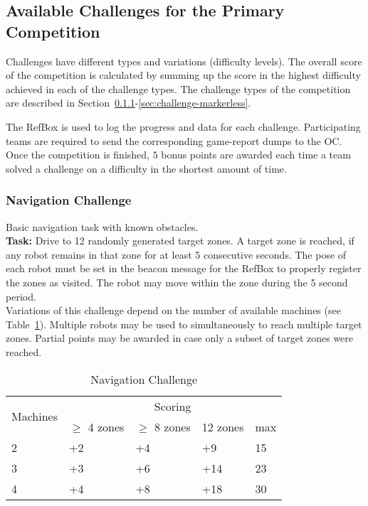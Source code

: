 \documentclass[12pt,twoside]{article}
\newcommand{\refsec}[1]{Section~\ref{#1}}
\newcommand{\reftab}[1]{Table~\ref{#1}}
\begin{document}
\subsection{Available Challenges for the Primary Competition}
\label{sec:challenges}
Challenges have different types and variations (difficulty levels).
The overall score of the competition is calculated by summing up the score
in the highest difficulty achieved in each of the challenge types.
The challenge types of the competition are described in
\refsec{sec:challenge-navigation}-\ref{sec:challenge-markerless}.

The RefBox is used to log the progress and data for each challenge.
Participating teams are required to send the corresponding game-report dumps
to the \ac{OC}.
Once the competition is finished, $5$ bonus points are awarded each time a
team solved a challenge on a difficulty in the shortest amount of time.

\subsubsection{Navigation Challenge}\label{sec:challenge-navigation}
Basic navigation task with known obstacles.\\
\textbf{Task:} Drive to 12 randomly generated target zones. A target zone is
reached, if any robot remains in that zone for at least 5 consecutive seconds.
The pose of each robot must be set in the beacon message
for the RefBox to properly register the zones as visited. The robot may move
within the zone during the 5 second period.\\
Variations of this challenge depend on the number of available machines
(see \reftab{tab:challenge-navigation}).
Multiple robots may be used to simultaneously to reach multiple target zones.
Partial points may be awarded in case only a subset of target zones were
reached.

\begin{table}[!htb]
 \centering
 \begin{tabular}{l|l|l|l|l}
  \multirow{2}{*}{Machines}
  & \multicolumn{4}{c}{Scoring} \\\cline{2-5}
	& $\geq$ 4 zones  & $\geq$ 8 zones & 12 zones  & max \\\hline\hline
	 2 & +2 & +4 & +9 & 15 \\
	 3 & +3 & +6 & +14 & 23 \\
	 4 & +4 & +8 & +18 & 30 \\
 \end{tabular}
 \caption{Navigation Challenge}
 \label{tab:challenge-navigation}
\end{table}
\end{document}
